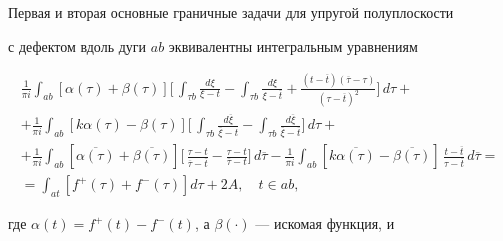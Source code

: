 \begin{thm}


Первая и вторая основные граничные задачи для упругой полуплоскости


с дефектом вдоль дуги $ab$ эквивалентны интегральным уравнениям


\begin{multline*}


\frac{1}{\pi i}\int_{ab} [\alpha(\tau)+\beta(\tau)]


\bigg[\,


\int_{\tau b}\frac{d\xi}{\xi-t} - \int_{\tau b}\frac{d\xi}{\xi


-\overline{t}}


+ \frac{(t-\overline{t})(\overline{\tau}-\tau)}{(\tau-\overline{t})^2}


\bigg]\,d\tau + \\


%


+ \frac{1}{\pi i}\int_{ab} [k\alpha(\tau)-\beta(\tau)]


\bigg[\,


\int_{\tau b}\frac{d\overline{\xi}}{\overline{\xi}-t}


- \int_{\tau b}\frac{d\overline{\xi}}{\overline{\xi}-\overline{t}}


\bigg]\,d\tau + \\


%


+ \frac{1}{\pi i}\int_{ab} [\overline{\alpha(\tau)}


+\overline{\beta(\tau)}]


\bigg[\,


\frac{\tau-t}{\overline{\tau}-\overline{t}} - \frac{\tau-t}{\overline{\tau}


-t}\bigg]\,d\overline{\tau}


- \frac{1}{\pi i}\int_{ab} [k\overline{\alpha(\tau)}


-\overline{\beta(\tau)}]


\,\frac{t-\overline{t}}{\tau-\overline{t}}\,d\overline{\tau} = \\


%


= \int_{at} [f^+(\tau)+f^-(\tau)]d\tau + 2A,\quad t\in ab ,


\end{multline*}


где $\alpha(t)=f^+(t)-f^-(t)$, а $\beta(\cdot)$ --- искомая функция, и


\begin{multline*}



\end{multline*}
\end{thm}

